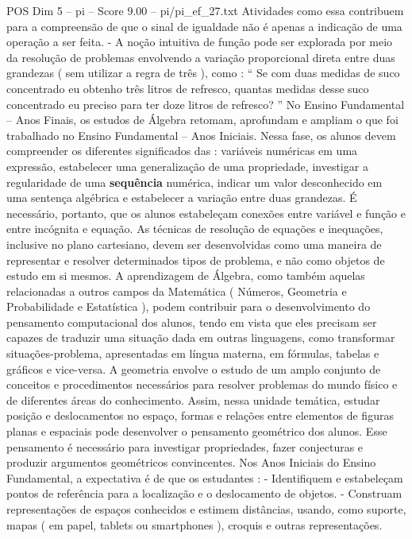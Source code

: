 \begin{textsample}{POS Dim 5 – pi – Score 9.00 – pi/pi\_ef\_27.txt}
Atividades como essa contribuem para a compreensão de que o sinal de igualdade não é apenas a indicação de uma operação a ser feita. - A noção intuitiva de função pode ser explorada por meio da resolução de problemas envolvendo a variação proporcional direta entre duas grandezas ( sem utilizar a regra de três ), como : “ Se com duas medidas de suco concentrado eu obtenho três litros de refresco, quantas medidas desse suco concentrado eu preciso para ter doze litros de refresco? ” No Ensino Fundamental – Anos Finais, os estudos de Álgebra retomam, aprofundam e ampliam o que foi trabalhado no Ensino Fundamental – Anos Iniciais.
Nessa fase, os alunos devem compreender os diferentes significados das : variáveis numéricas em uma expressão, estabelecer uma generalização de uma propriedade, investigar a regularidade de uma \textbf{sequência} numérica, indicar um valor desconhecido em uma sentença algébrica e estabelecer a variação entre duas grandezas.
É necessário, portanto, que os alunos estabeleçam conexões entre variável e função e entre incógnita e equação.
As técnicas de resolução de equações e inequações, inclusive no plano cartesiano, devem ser desenvolvidas como uma maneira de representar e resolver determinados tipos de problema, e não como objetos de estudo em si mesmos.
A aprendizagem de Álgebra, como também aquelas relacionadas a outros campos da Matemática ( Números, Geometria e Probabilidade e Estatística ), podem contribuir para o desenvolvimento do pensamento computacional dos alunos, tendo em vista que eles precisam ser capazes de traduzir uma situação dada em outras linguagens, como transformar situações-problema, apresentadas em língua materna, em fórmulas, tabelas e gráficos e vice-versa.
A geometria envolve o estudo de um amplo conjunto de conceitos e procedimentos necessários para resolver problemas do mundo físico e de diferentes áreas do conhecimento.
Assim, nessa unidade temática, estudar posição e deslocamentos no espaço, formas e relações entre elementos de figuras planas e espaciais pode desenvolver o pensamento geométrico dos alunos.
Esse pensamento é necessário para investigar propriedades, fazer conjecturas e produzir argumentos geométricos convincentes.
Nos Anos Iniciais do Ensino Fundamental, a expectativa é de que os estudantes : - Identifiquem e estabeleçam pontos de referência para a localização e o deslocamento de objetos. - Construam representações de espaços conhecidos e estimem distâncias, usando, como suporte, mapas ( em papel, tablets ou smartphones ), croquis e outras representações.

\end{textsample}
